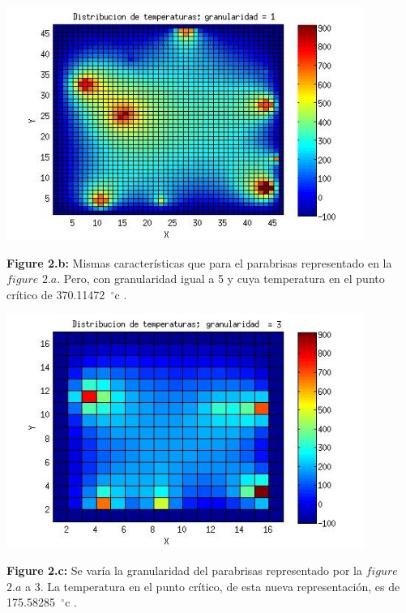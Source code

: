 \documentclass[a4paper]{article}
\begin{document}
\includegraphics[width=\textwidth,height=3.0in,keepaspectratio
]{45x45h1.jpg} \newline
\begin {flushleft}
\textbf{Figure 2.b:} Mismas características que para el parabrisas representado en la $figure$ $2.a$. Pero, con granularidad igual a 5 y cuya temperatura en el punto crítico de 370.11472\hspace{-1.5mm}$\phantom{a}^{\circ}$c .
\end{flushleft}

\includegraphics[width=\textwidth,height=3.0in,keepaspectratio
]{45x45h3.jpg} \newline
\begin {flushleft}
\textbf{Figure 2.c:} Se varía la granularidad del parabrisas representado por la $figure$ $2.a$ a 3. La temperatura en el punto crítico, de esta nueva representación, es de 175.58285\hspace{-1.5mm}$\phantom{a}^{\circ}$c .
\end{flushleft}
\end{document}
